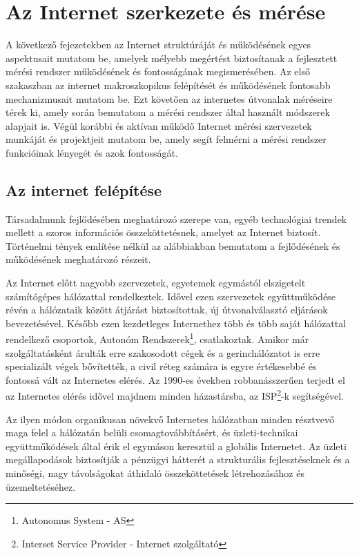 \chapter{Az Internet szerkezete és mérése}

A következő fejezetekben az Internet struktúráját és működésének egyes aspektusait mutatom be, amelyek mélyebb megértést biztosítanak a fejlesztett mérési rendszer működésének és fontosságának megismerésében.
Az első szakaszban az internet makroszkopikus felépítését és működésének fontosabb mechanizmusait mutatom be. Ezt követően az internetes útvonalak méréseire térek ki, amely során bemutatom a mérési rendszer által használt módszerek alapjait is. Végül korábbi és aktívan működő Internet mérési szervezetek munkáját és projektjeit mutatom be, amely segít felmérni a mérési rendszer funkcióinak lényegét és azok fontosságát.



\section{Az internet felépítése}



Társadalmunk fejlődésében meghatározó szerepe van, egyéb technológiai trendek mellett a szoros információs összeköttetésnek, amelyet az Internet biztosít. Történelmi tények említése nélkül az alábbiakban bemutatom a fejlődésének és működésének meghatározó részeit.

Az Internet előtt nagyobb szervezetek, egyetemek egymástól elszigetelt számítógépes hálózattal rendelkeztek. Idővel ezen szervezetek együttműködése révén a hálózataik között átjárást biztosítottak, új útvonalválasztó eljárások bevezetésével. Később ezen kezdetleges Internethez több és több saját hálózattal rendelkező csoportok, Autonóm Rendszerek\footnote{Autonomus System - AS}, csatlakoztak. Amikor már szolgáltatásként árulták erre szakosodott cégek és a gerinchálózatot is erre specializált végek bővítették,  a civil réteg számára is egyre értékesebbé és fontossá vált az Internetes elérés. Az 1990-es években robbanásszerűen terjedt el az Internetes elérés idővel majdnem minden házastársba, az ISP\footnote{Interset Service Provider - Internet szolgáltató}-k segítségével.

Az ilyen módon organikusan növekvő Internetes hálózatban  minden résztvevő maga felel a hálózatán belüli csomagtovábbításért, és üzleti-technikai együttműködések által érik el egymáson keresztül a globális Internetet. Az üzleti megállapodások biztosítják a pénzügyi hátterét a strukturális fejlesztéseknek és a minőségi, nagy távolságokat áthidaló összeköttetések létrehozásához és üzemeltetéséhez.

